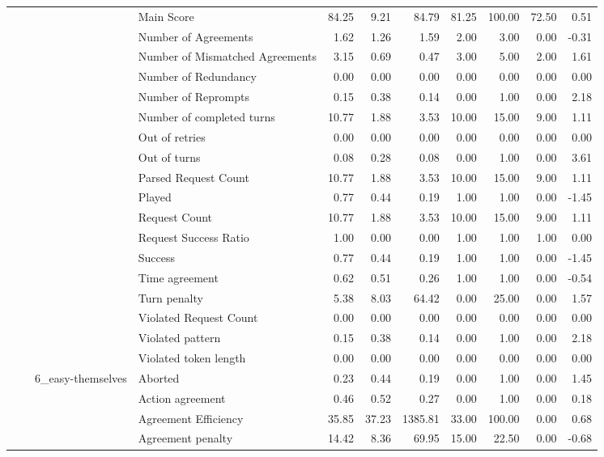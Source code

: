 \begin{tabular}{llllrrrrrrr}
 &  &  & Main Score & 84.25 & 9.21 & 84.79 & 81.25 & 100.00 & 72.50 & 0.51 \\
 &  &  & Number of Agreements & 1.62 & 1.26 & 1.59 & 2.00 & 3.00 & 0.00 & -0.31 \\
 &  &  & Number of Mismatched Agreements & 3.15 & 0.69 & 0.47 & 3.00 & 5.00 & 2.00 & 1.61 \\
 &  &  & Number of Redundancy & 0.00 & 0.00 & 0.00 & 0.00 & 0.00 & 0.00 & 0.00 \\
 &  &  & Number of Reprompts & 0.15 & 0.38 & 0.14 & 0.00 & 1.00 & 0.00 & 2.18 \\
 &  &  & Number of completed turns & 10.77 & 1.88 & 3.53 & 10.00 & 15.00 & 9.00 & 1.11 \\
 &  &  & Out of retries & 0.00 & 0.00 & 0.00 & 0.00 & 0.00 & 0.00 & 0.00 \\
 &  &  & Out of turns & 0.08 & 0.28 & 0.08 & 0.00 & 1.00 & 0.00 & 3.61 \\
 &  &  & Parsed Request Count & 10.77 & 1.88 & 3.53 & 10.00 & 15.00 & 9.00 & 1.11 \\
 &  &  & Played & 0.77 & 0.44 & 0.19 & 1.00 & 1.00 & 0.00 & -1.45 \\
 &  &  & Request Count & 10.77 & 1.88 & 3.53 & 10.00 & 15.00 & 9.00 & 1.11 \\
 &  &  & Request Success Ratio & 1.00 & 0.00 & 0.00 & 1.00 & 1.00 & 1.00 & 0.00 \\
 &  &  & Success & 0.77 & 0.44 & 0.19 & 1.00 & 1.00 & 0.00 & -1.45 \\
 &  &  & Time agreement & 0.62 & 0.51 & 0.26 & 1.00 & 1.00 & 0.00 & -0.54 \\
 &  &  & Turn penalty & 5.38 & 8.03 & 64.42 & 0.00 & 25.00 & 0.00 & 1.57 \\
 &  &  & Violated Request Count & 0.00 & 0.00 & 0.00 & 0.00 & 0.00 & 0.00 & 0.00 \\
 &  &  & Violated pattern & 0.15 & 0.38 & 0.14 & 0.00 & 1.00 & 0.00 & 2.18 \\
 &  &  & Violated token length & 0.00 & 0.00 & 0.00 & 0.00 & 0.00 & 0.00 & 0.00 \\
\cline{3-11}
 &  & \multirow[t]{27}{*}{6_easy-themselves} & Aborted & 0.23 & 0.44 & 0.19 & 0.00 & 1.00 & 0.00 & 1.45 \\
 &  &  & Action agreement & 0.46 & 0.52 & 0.27 & 0.00 & 1.00 & 0.00 & 0.18 \\
 &  &  & Agreement Efficiency & 35.85 & 37.23 & 1385.81 & 33.00 & 100.00 & 0.00 & 0.68 \\
 &  &  & Agreement penalty & 14.42 & 8.36 & 69.95 & 15.00 & 22.50 & 0.00 & -0.68 \\

\end{tabular}

